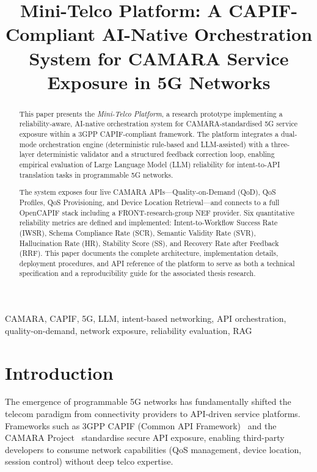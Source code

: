 \documentclass[conference]{IEEEtran}
\title{Mini-Telco Platform: A CAPIF-Compliant AI-Native Orchestration\\
System for CAMARA Service Exposure in 5G Networks}
\author{
  \IEEEauthorblockN{Türkan Doğa Durak}
  \IEEEauthorblockA{Centre Tecnològic de Telecomunicacions de Catalunya (CTTC)\\
  Castelldefels, Spain\\
  turkandoga.durak@cttc.es}
}
\begin{document}
\maketitle

\begin{abstract}
This paper presents the \textit{Mini-Telco Platform}, a research prototype
implementing a reliability-aware, AI-native orchestration system for
CAMARA-standardised 5G service exposure within a 3GPP CAPIF-compliant
framework. The platform integrates a dual-mode orchestration engine
(deterministic rule-based and LLM-assisted) with a three-layer deterministic
validator and a structured feedback correction loop, enabling empirical
evaluation of Large Language Model (LLM) reliability for intent-to-API
translation tasks in programmable 5G networks.

The system exposes four live CAMARA APIs—Quality-on-Demand (QoD),
QoS Profiles, QoS Provisioning, and Device Location Retrieval—and
connects to a full OpenCAPIF stack including a FRONT-research-group NEF
provider. Six quantitative reliability metrics are defined and implemented:
Intent-to-Workflow Success Rate (IWSR), Schema Compliance Rate (SCR),
Semantic Validity Rate (SVR), Hallucination Rate (HR), Stability Score (SS),
and Recovery Rate after Feedback (RRF). This paper documents the complete
architecture, implementation details, deployment procedures, and API reference
of the platform to serve as both a technical specification and a reproducibility
guide for the associated thesis research.
\end{abstract}

\begin{IEEEkeywords}
CAMARA, CAPIF, 5G, LLM, intent-based networking, API orchestration,
quality-on-demand, network exposure, reliability evaluation, RAG
\end{IEEEkeywords}

\section{Introduction}
\label{sec:intro}

The emergence of programmable 5G networks has fundamentally shifted the
telecom paradigm from connectivity providers to API-driven service platforms.
Frameworks such as 3GPP CAPIF (Common API Framework)~\cite{3gpp_capif} and
the CAMARA Project~\cite{camara2022} standardise secure API exposure, enabling
third-party developers to consume network capabilities (QoS management, device
location, session control) without deep telco expertise.
\end{document}

